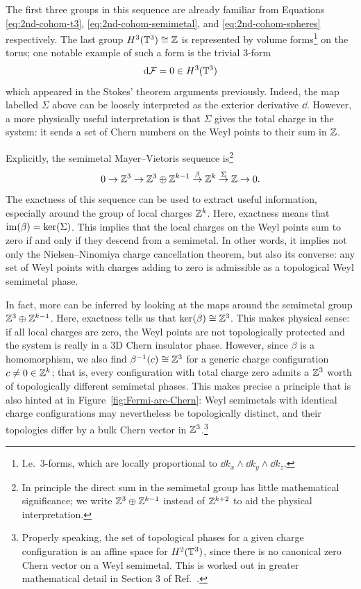 The first three groups in this sequence are already familiar from Equations \eqref{eq:2nd-cohom-t3}, \eqref{eq:2nd-cohom-semimetal}, and \eqref{eq:2nd-cohom-spheres} respectively.  %
The last group $H^3(\mathbb{T}^3)\cong\mathbb{Z}$ is represented by volume forms\footnote{
	I.e.\ 3-forms, which are locally proportional to $\dd{k_x}\wedge\dd{k_y}\wedge\dd{k_z}$.}
on the torus; one notable example of such a form is the trivial 3-form
\begin{equation*}
	\dd{\mathcal{F}} = 0 \in H^3(\mathbb{T}^3)
\end{equation*}
which appeared in the Stokes' theorem arguments previously. Indeed, the map labelled $\Sigma$ above can be loosely interpreted as the exterior derivative $\dd$. However, a more physically useful interpretation is that $\Sigma$ gives the total charge in the system: it sends a set of Chern numbers on the Weyl points to their sum in $\mathbb{Z}$.

Explicitly, the semimetal Mayer--Vietoris sequence is\footnote{
	In principle the direct sum in the semimetal group has little mathematical significance; we write $\mathbb{Z}^3\oplus\mathbb{Z}^{k-1}$ instead of $\mathbb{Z}^{k+2}$ to aid the physical interpretation.}
\begin{equation}\label{eq:semimetal-MV-explicit}
	0 \to \mathbb{Z}^3 \to \mathbb{Z}^3\oplus\mathbb{Z}^{k-1} \overset{\beta}{\to} \mathbb{Z}^k \overset{\Sigma}{\to} \mathbb{Z} \to 0.
\end{equation}
The exactness of this sequence can be used to extract useful information, especially around the group of local charges $\mathbb{Z}^k$. Here, exactness means that $\operatorname{im}(\beta) = \ker(\Sigma)$. %
This implies that the local charges on the Weyl points sum to zero if and only if they descend from a semimetal. In other words, it implies not only the Nielsen--Ninomiya charge cancellation theorem, but also its converse: any set of Weyl points with charges adding to zero is admissible as a topological Weyl semimetal phase.

In fact, more can be inferred by looking at the maps around the semimetal group $\mathbb{Z}^3\oplus\mathbb{Z}^{k-1}$. Here, exactness tells us that $\ker(\beta)\cong\mathbb{Z}^3$. This makes physical sense: if all local charges are zero, the Weyl points are not topologically protected and the system is really in a 3D Chern insulator phase. However, since $\beta$ is a homomorphism, we also find $\beta^{-1}(c)\cong\mathbb{Z}^3$ for a generic charge configuration $c\neq 0\in\mathbb{Z}^k$; that is, every configuration with total charge zero admits a $\mathbb{Z}^3$ worth of topologically different semimetal phases. %
This makes precise a principle that is also hinted at in Figure~\ref{fig:Fermi-arc-Chern}: Weyl semimetals with identical charge configurations may nevertheless be topologically distinct, and their topologies differ by a bulk Chern vector in $\mathbb{Z}^3$.\footnote{
	Properly speaking, the set of topological phases for a given charge configuration is an affine space for $H^2(\mathbb{T}^3)$, since there is no canonical zero Chern vector on a Weyl semimetal. This is worked out in greater mathematical detail in Section 3 of Ref.~\cite{Mathai_math-review}.}


